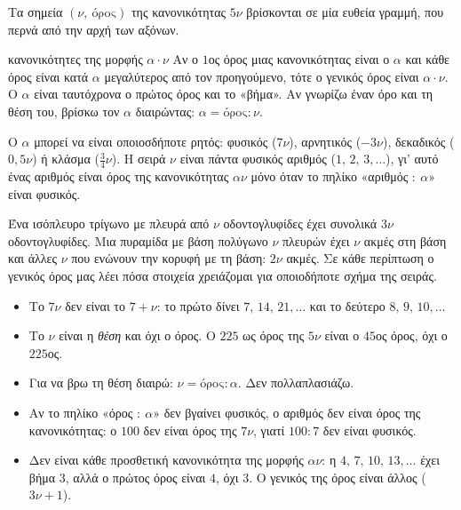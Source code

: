 \begin{center}
\end{center}

Τα σημεία $(\nu,\ \text{όρος})$ της κανονικότητας $5\nu$ βρίσκονται σε μία ευθεία γραμμή, που περνά από την αρχή των αξόνων.

\begin{kanonas}{κανονικότητες της μορφής $\alpha\cdot\nu$}
Αν ο $1$ος όρος μιας κανονικότητας είναι ο $\alpha$ και κάθε όρος είναι κατά $\alpha$ μεγαλύτερος από τον προηγούμενο, τότε ο γενικός όρος είναι $\alpha\cdot\nu$. Ο $\alpha$ είναι ταυτόχρονα ο πρώτος όρος και το «βήμα». Αν γνωρίζω έναν όρο και τη θέση του, βρίσκω τον $\alpha$ διαιρώντας: $\alpha=\text{όρος}:\nu$.
\end{kanonas}

Ο $\alpha$ μπορεί να είναι οποιοσδήποτε ρητός: φυσικός ($7\nu$), αρνητικός ($-3\nu$), δεκαδικός ($0{,}5\nu$) ή κλάσμα ($\frac{3}{4}\nu$). Η σειρά $\nu$ είναι πάντα φυσικός αριθμός ($1,\,2,\,3,\dots$), γι' αυτό ένας αριθμός είναι όρος της κανονικότητας $\alpha\nu$ μόνο όταν το πηλίκο «αριθμός $:\ \alpha$» είναι φυσικός.


Ένα ισόπλευρο τρίγωνο με πλευρά από $\nu$ οδοντογλυφίδες έχει συνολικά $3\nu$ οδοντογλυφίδες. Μια πυραμίδα με βάση πολύγωνο $\nu$ πλευρών έχει $\nu$ ακμές στη βάση και άλλες $\nu$ που ενώνουν την κορυφή με τη βάση: $2\nu$ ακμές. Σε κάθε περίπτωση ο γενικός όρος μας λέει πόσα στοιχεία χρειάζομαι για οποιοδήποτε σχήμα της σειράς.

\begin{prosoxi}
\begin{itemize}[leftmargin=1.2em,itemsep=0.3ex,topsep=2pt]
\item Το $7\nu$ δεν είναι το $7+\nu$: το πρώτο δίνει $7,\,14,\,21,\dots$ και το δεύτερο $8,\,9,\,10,\dots$
\item Το $\nu$ είναι η \emph{θέση} και όχι ο όρος. Ο $225$ ως όρος της $5\nu$ είναι ο $45$ος όρος, όχι ο $225$ος.
\item Για να βρω τη θέση διαιρώ: $\nu=\text{όρος}:\alpha$. Δεν πολλαπλασιάζω.
\item Αν το πηλίκο «όρος $:\ \alpha$» δεν βγαίνει φυσικός, ο αριθμός δεν είναι όρος της κανονικότητας: ο $100$ δεν είναι όρος της $7\nu$, γιατί $100:7$ δεν είναι φυσικός.
\item Δεν είναι κάθε προσθετική κανονικότητα της μορφής $\alpha\nu$: η $4,\,7,\,10,\,13,\dots$ έχει βήμα $3$, αλλά ο πρώτος όρος είναι $4$, όχι $3$. Ο γενικός της όρος είναι άλλος ($3\nu+1$).
\end{itemize}
\end{prosoxi}

